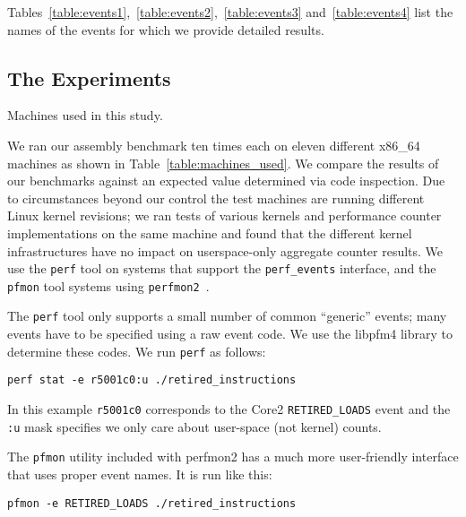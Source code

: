 Tables~\ref{table:events1},~\ref{table:events2},~\ref{table:events3}
and~\ref{table:events4}
list the names of the events for which
we provide detailed results.

\subsection{The Experiments}

\begin{table}[!t]
\renewcommand{\arraystretch}{1.3}
\caption{Machines used in this study.  
}
\label{table:machines_used}
\centering

\end{table}

We ran our assembly benchmark ten times each on eleven different x86\_64 
machines as shown in Table~\ref{table:machines_used}.
We compare the results of our benchmarks against an expected value 
determined via code inspection.  
Due to circumstances beyond our control the test machines are 
running different Linux kernel revisions;
we ran tests of 
various kernels and performance counter implementations on the same machine
and found that the different kernel infrastructures
have no impact on userspace-only aggregate counter results.
We use the {\tt perf} tool on systems that support the {\tt perf\_events}
interface, and the {\tt pfmon}
tool systems using {\tt perfmon2}~\cite{eranian:ols06}.

The {\tt perf} tool only supports a small number of common ``generic'' 
events; many events have to be specified using a
raw event code.  We use the libpfm4 library to determine these codes.
We run {\tt perf} as follows:

\begin{footnotesize}
{\tt perf stat -e r5001c0:u ./retired\_instructions}
\end{footnotesize}

\noindent
In this example {\tt r5001c0} corresponds to the Core2 
{\tt RETIRED\_LOADS} event
and the {\tt :u} mask specifies
we only care about user-space (not kernel) counts.

The {\tt pfmon} utility included with perfmon2
has a much more user-friendly interface that uses proper event names.
It is run like this:

\begin{footnotesize}
{\tt pfmon -e RETIRED\_LOADS ./retired\_instructions}
\end{footnotesize}

